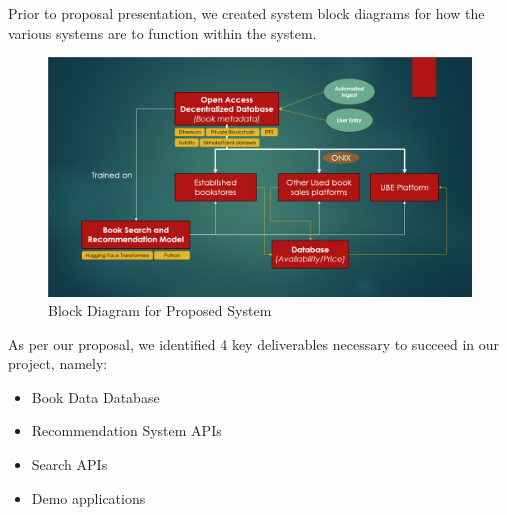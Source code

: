 Prior to proposal presentation, we created system block diagrams for how the various systems are to function within the system.

\begin{figure}[htbp]
    \centering
    \includegraphics[width=1\textwidth]{../../assets/proposal_block_diagram.png}
    \caption{Block Diagram for Proposed System}
    \label{fig:example}
\end{figure}

As per our proposal, we identified 4 key deliverables necessary to succeed in our project, namely:

\begin{itemize}
    \item Book Data Database
    \item Recommendation System APIs
    \item Search APIs
    \item Demo applications
\end{itemize}

